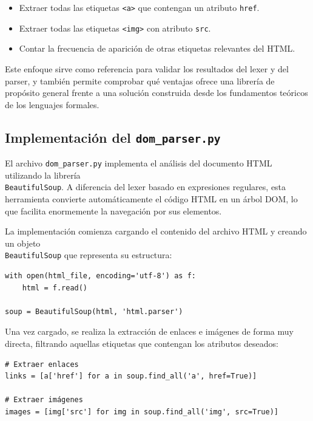 \documentclass[11pt,a4paper]{article}
\begin{document}
\begin{itemize}
    \item Extraer todas las etiquetas \texttt{<a>} que contengan un atributo \texttt{href}.
    \item Extraer todas las etiquetas \texttt{<img>} con atributo \texttt{src}.
    \item Contar la frecuencia de aparición de otras etiquetas relevantes del HTML.
\end{itemize}

\medskip

Este enfoque sirve como referencia para validar los resultados del lexer y del parser, y también permite comprobar qué ventajas ofrece una librería de propósito general frente a una solución construida desde los fundamentos teóricos de los lenguajes formales.

\subsection{Implementación del \texttt{dom\_parser.py}}

El archivo \texttt{dom\_parser.py} implementa el análisis del documento HTML utilizando la librería\\ \texttt{BeautifulSoup}. A diferencia del lexer basado en expresiones regulares, esta herramienta convierte automáticamente el código HTML en un árbol DOM, lo que facilita enormemente la navegación por sus elementos.

\medskip

La implementación comienza cargando el contenido del archivo HTML y creando un objeto\\ \texttt{BeautifulSoup} que representa su estructura:

\begin{verbatim}
with open(html_file, encoding='utf-8') as f:
    html = f.read()

soup = BeautifulSoup(html, 'html.parser')
\end{verbatim}

\medskip

Una vez cargado, se realiza la extracción de enlaces e imágenes de forma muy directa, filtrando aquellas etiquetas que contengan los atributos deseados:

\begin{verbatim}
# Extraer enlaces
links = [a['href'] for a in soup.find_all('a', href=True)]

# Extraer imágenes
images = [img['src'] for img in soup.find_all('img', src=True)]
\end{verbatim}
\end{document}
